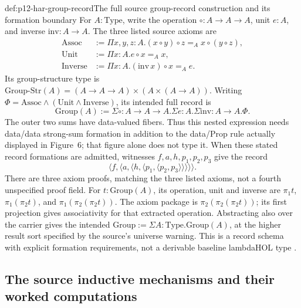\begin{hbexample}{def:p12-har-group-record}{The full source group-record construction and its formation boundary}
For \(A:\mathrm{Type}\), write the operation \(\circ:A\to A\to A\),
unit \(e:A\), and inverse \(\mathrm{inv}:A\to A\). The three
listed source axioms are
\[
\begin{aligned}
 \mathrm{Assoc}&:=\Pi x,y,z:A.(x\circ y)\circ z=_A x\circ(y\circ z),\\
 \mathrm{Unit}&:=\Pi x:A.e\circ x=_A x,\\
 \mathrm{Inverse}&:=\Pi x:A.(\mathrm{inv}\,x)\circ x=_A e.
\end{aligned}
\]
Its group-structure type is
\(\mathrm{Group\!\mbox{-}\!Str}(A)=
(A\to A\to A)\times(A\times(A\to A))\).
Writing \(\Phi=\mathrm{Assoc}\land
(\mathrm{Unit}\land\mathrm{Inverse})\), its intended full record is
\[
 \mathrm{Group}(A):=
 \Sigma\circ:A\to A\to A.\Sigma e:A.
       \Sigma\mathrm{inv}:A\to A.\Phi.
\]
The outer two sums have data-valued fibers. Thus this nested expression
needs data/data strong-sum formation in addition to the data/Prop rule
actually displayed in Figure~6; that figure alone does not type it.
When these stated record formations are admitted, witnesses
\(f,a,h,p_1,p_2,p_3\) give the record
\[
 \langle f,\langle a,\langle h,
       \langle p_1,\langle p_2,p_3\rangle\rangle
       \rangle\rangle\rangle.
\]
There are three axiom proofs, matching the three listed axioms, not a
fourth unspecified proof field. For \(t:\mathrm{Group}(A)\), its
operation, unit and inverse are \(\pi_1t\),
\(\pi_1(\pi_2t)\), and \(\pi_1(\pi_2(\pi_2t))\).
The axiom package is \(\pi_2(\pi_2(\pi_2t))\); its first
projection gives associativity for that extracted operation.
Abstracting also over the carrier gives the intended
\(\mathrm{Group}:=\Sigma A:\mathrm{Type}.\mathrm{Group}(A)\),
at the higher result sort specified by the source's universe warning.
This is a record schema with explicit formation requirements, not a
derivable baseline lambdaHOL type
\cite[pp.~1204--1205]{BarendregtGeuvers2001}.
\end{hbexample}

\subsection{The source inductive mechanisms and their worked computations}

